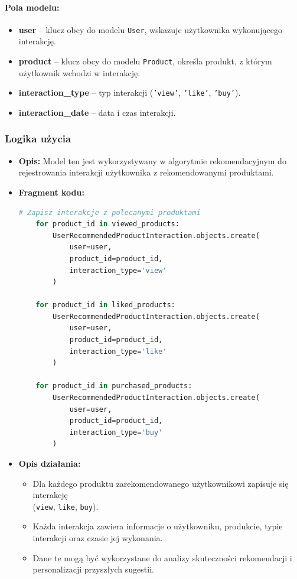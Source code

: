 \documentclass[12pt,a4paper,oneside]{article}
\theoremstyle{definition}
\numberwithin{equation}{section}
\begin{document}
\paragraph{Pola modelu:}
\begin{itemize}
    \item \textbf{user} -- klucz obcy do modelu \texttt{User}, wskazuje użytkownika wykonującego interakcję.
    \item \textbf{product} -- klucz obcy do modelu \texttt{Product}, określa produkt, z którym użytkownik wchodzi w interakcję.
    \item \textbf{interaction\_type} -- typ interakcji (\texttt{'view'}, \texttt{'like'}, \texttt{'buy'}).
    \item \textbf{interaction\_date} -- data i czas interakcji.
\end{itemize}

\subsubsection{Logika użycia}
\begin{itemize}
    \item \textbf{Opis: }Model ten jest wykorzystywany w algorytmie rekomendacyjnym do rejestrowania interakcji 
    użytkownika z rekomendowanymi produktami.
    \item \textbf{Fragment kodu:}
    \begin{lstlisting}[language=Python, caption={Fragment \texttt{get_recommended_products}}]
    # Zapisz interakcje z polecanymi produktami
    for product_id in viewed_products:
        UserRecommendedProductInteraction.objects.create(
            user=user,
            product_id=product_id,
            interaction_type='view'
        )
    
    for product_id in liked_products:
        UserRecommendedProductInteraction.objects.create(
            user=user,
            product_id=product_id,
            interaction_type='like'
        )
    
    for product_id in purchased_products:
        UserRecommendedProductInteraction.objects.create(
            user=user,
            product_id=product_id,
            interaction_type='buy'
        )
        \end{lstlisting}

    \item \textbf{Opis działania:}
        \begin{itemize}
            \item Dla każdego produktu zarekomendowanego użytkownikowi zapisuje się 
            interakcję\\ (\texttt{view}, \texttt{like}, \texttt{buy}).
            \item Każda interakcja zawiera informacje o użytkowniku, produkcie, typie interakcji oraz czasie jej wykonania.
            \item Dane te mogą być wykorzystane do analizy skuteczności rekomendacji i personalizacji przyszłych sugestii.
        \end{itemize}
\end{itemize}
\end{document}
